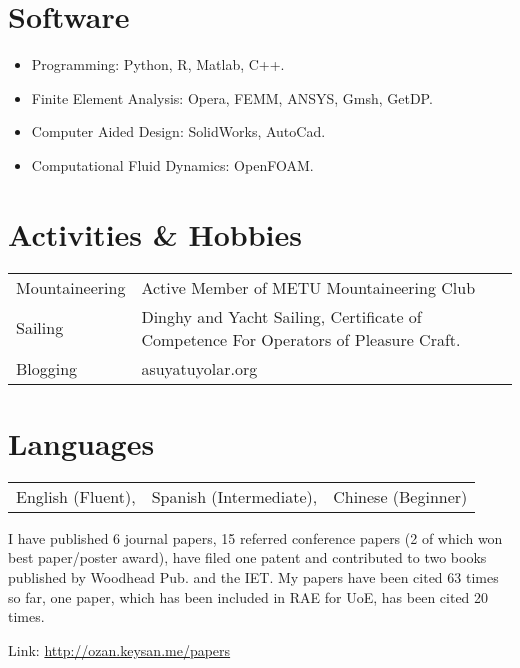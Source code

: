 \documentclass[a4paper,12pt]{article}
\begin{document}
\section{Software}
\begin{itemize}
\item Programming: Python, R, Matlab, C++.
\item Finite Element Analysis: Opera, FEMM, ANSYS, Gmsh, GetDP.
\item Computer Aided Design: SolidWorks, AutoCad.
\item Computational Fluid Dynamics: OpenFOAM.
\end{itemize}

\section{Activities \& Hobbies}
\begin{tabular}{ll}
Mountaineering & Active Member of METU Mountaineering Club\\
Sailing & Dinghy and Yacht Sailing, Certificate of Competence For Operators of Pleasure Craft. \\
Blogging & asuyatuyolar.org\\
\end{tabular}

\section{Languages}
\begin{tabular}{lll} 
English (Fluent), & Spanish (Intermediate), & Chinese (Beginner)
\end{tabular}


\begin{publications}

I have published 6 journal papers, 15 referred conference papers (2 of which won best paper/poster award), have filed one patent and contributed to two books published by Woodhead Pub. and the IET. My papers have been cited 63 times so far, one paper, which has been included in RAE for UoE, has been cited 20 times.

Link: \url{http://ozan.keysan.me/papers}

\end{publications}


\end{document}
